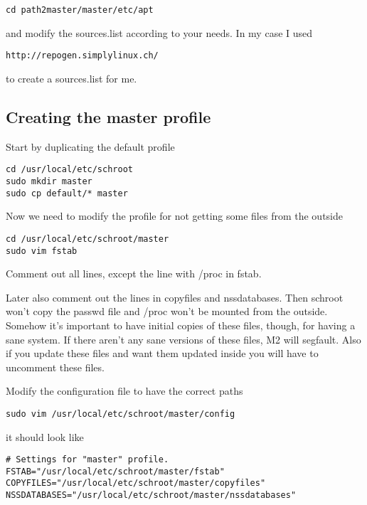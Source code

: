 \documentclass[a4paper]{book}
\begin{document}
\begin{verbatim}
cd path2master/master/etc/apt
\end{verbatim}

and modify the sources.list according to your needs. In my case I used

\begin{verbatim}
http://repogen.simplylinux.ch/
\end{verbatim}

to create a sources.list for me.
\subsection{Creating the master profile}

Start by duplicating the default profile

\begin{verbatim}
cd /usr/local/etc/schroot
sudo mkdir master
sudo cp default/* master
\end{verbatim}

Now we need to modify the profile for not getting some files from the outside

\begin{verbatim}
cd /usr/local/etc/schroot/master
sudo vim fstab
\end{verbatim}

Comment out all lines, except the line with /proc in fstab. 

Later also comment out the lines in copyfiles and nssdatabases.  Then schroot
won't copy the passwd file and /proc won't be mounted from the outside.
Somehow it's important to have initial copies of these files, though, for
having a sane system. If there aren't any sane versions of these files, M2 will
segfault.  Also if you update these files and want them updated inside you will
have to uncomment these files.

Modify the configuration file to have the correct paths

\begin{verbatim}
sudo vim /usr/local/etc/schroot/master/config
\end{verbatim}

it should look like

\begin{verbatim}
# Settings for "master" profile.
FSTAB="/usr/local/etc/schroot/master/fstab"
COPYFILES="/usr/local/etc/schroot/master/copyfiles"
NSSDATABASES="/usr/local/etc/schroot/master/nssdatabases"
\end{verbatim}
\end{document}
